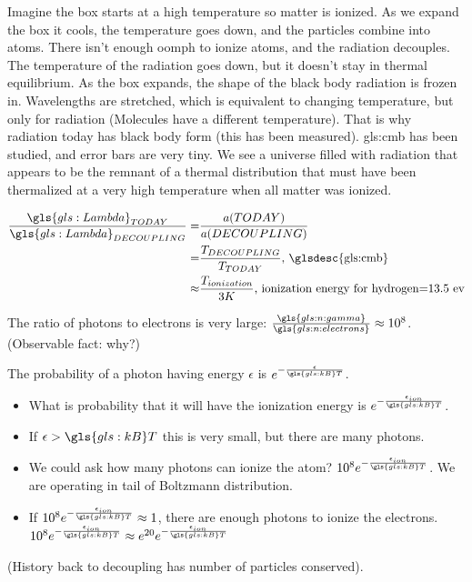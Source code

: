 \documentclass[]{article}
\begin{document}
Imagine the box starts at a high temperature so matter is ionized. As we expand the box it cools, the temperature goes down, and the particles combine into atoms. There isn't enough oomph to ionize atoms, and the radiation decouples. The temperature of the radiation goes down, but it doesn't stay in thermal equilibrium. As the box expands, the shape of the black body radiation is frozen in. Wavelengths are stretched, which is equivalent to changing temperature, but only for radiation (Molecules have a different temperature). That is why radiation today has black body form (this has been measured). \gls{gls:cmb} has been studied, and error bars are very tiny. We see a universe filled with radiation that appears to be the remnant of a thermal distribution that must have been thermalized at a very high temperature when all matter was ionized.

\begin{align*}
	\frac{\gls{gls:Lambda}_{TODAY}}{\gls{gls:Lambda}_{DECOUPLING}} =& \frac{a(TODAY)}{a(DECOUPLING)}\\
	=&\frac{T_{DECOUPLING}}{T_{TODAY}} \text{, \glsdesc{gls:cmb}}\\
	\approx& \frac{T_{ionization}}{3K} \text{, ionization energy for hydrogen=13.5 ev}
\end{align*}

The ratio of photons to electrons is very large: $\frac{\gls{gls:n:gamma}}{\gls{gls:n:electrons}}\approx 10^8$. (Observable fact: why?)


The probability of a photon having energy $\epsilon$ is $e^{-\frac{\epsilon}{\gls{gls:kB}T}}$.\begin{itemize}
	\item  What is probability that it will have the ionization energy is $e^{-\frac{\epsilon_{ion}}{\gls{gls:kB}T}}$.
	\item If $\epsilon>\gls{gls:kB}T$ this is very small, but there are many photons.
	\item We could ask how many photons can ionize the atom? $10^8 e^{-\frac{\epsilon_{ion}}{\gls{gls:kB}T}}$. We are operating in tail of Boltzmann distribution.
	\item If $10^8 e^{-\frac{\epsilon_{ion}}{\gls{gls:kB}T}} \approx 1$, there are enough photons to ionize the electrons. $10^8 e^{-\frac{\epsilon_{ion}}{\gls{gls:kB}T}} \approx e^{20} e^{-\frac{\epsilon_{ion}}{\gls{gls:kB}T}}$
\end{itemize}

(History back to decoupling has number of particles conserved).
\end{document}
